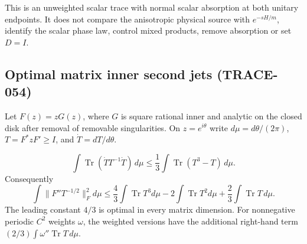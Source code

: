 This is an unweighted scalar trace with normal scalar absorption at both
unitary endpoints. It does not compare the anisotropic physical source
with $e^{-sH/m}$, identify the scalar phase law, control mixed products,
remove absorption or set $D=I$.

\subsection{Optimal matrix inner second jets (TRACE-054)}
Let $F(z)=zG(z)$, where $G$ is square rational inner and analytic on the
closed disk after removal of removable singularities. On $z=e^{i\theta}$
write $d\mu=d\theta/(2\pi)$,
$T=F^*zF'\ge I$, and $\dot T=dT/d\theta$.
\begin{theorem}
\[
 \int\operatorname{Tr}(\dot T T^{-1}\dot T)\,d\mu
 \le\frac13\int\operatorname{Tr}(T^3-T)\,d\mu.
\]
Consequently
\[
 \int\|F''T^{-1/2}\|_F^2d\mu
 \le\frac43\int\operatorname{Tr}T^3d\mu
 -2\int\operatorname{Tr}T^2d\mu
 +\frac23\int\operatorname{Tr}T\,d\mu.
\]
The leading constant $4/3$ is optimal in every matrix dimension.
For nonnegative periodic $C^2$ weights $\omega$, the weighted versions
have the additional right-hand term
$(2/3)\int\omega''\operatorname{Tr}T\,d\mu$.
\end{theorem}
